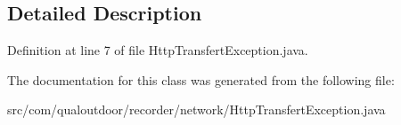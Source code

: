 \subsection{Detailed Description}


Definition at line 7 of file Http\-Transfert\-Exception.\-java.



The documentation for this class was generated from the following file\-:\begin{DoxyCompactItemize}
\item 
src/com/qualoutdoor/recorder/network/Http\-Transfert\-Exception.\-java\end{DoxyCompactItemize}
